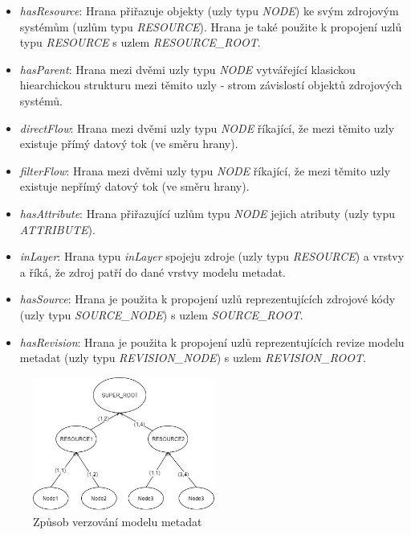  \begin{itemize}
	\item{\textit{hasResource}}: Hrana přiřazuje objekty (uzly typu \textit{NODE}) ke svým zdrojovým systémům (uzlům typu \textit{RESOURCE}). Hrana je také použite k propojení uzlů typu \textit{RESOURCE} s uzlem \textit{RESOURCE\_ROOT}.
	\item{\textit{hasParent}}: Hrana mezi dvěmi uzly typu \textit{NODE} vytvářející klasickou hiearchickou strukturu mezi těmito uzly - strom závislostí objektů zdrojových systémů.
	\item{\textit{directFlow}}: Hrana mezi dvěmi uzly typu \textit{NODE} říkající, že mezi těmito uzly existuje přímý datový tok (ve směru hrany).
	\item{\textit{filterFlow}}: Hrana mezi dvěmi uzly typu \textit{NODE} říkající, že mezi těmito uzly existuje nepřímý datový tok (ve směru hrany).
	\item{\textit{hasAttribute}}: Hrana přiřazující uzlům typu \textit{NODE} jejich atributy (uzly typu \textit{ATTRIBUTE}).
	\item{\textit{inLayer}}: Hrana typu \textit{inLayer} spojeju zdroje (uzly typu \textit{RESOURCE}) a vrstvy a říká, že zdroj patří do dané vrstvy modelu metadat.
	\item{\textit{hasSource}}: Hrana je použita k propojení uzlů reprezentujících zdrojové kódy (uzly typu \textit{SOURCE\_NODE}) s uzlem \textit{SOURCE\_ROOT}.
	\item{\textit{hasRevision}}: Hrana je použita k propojení uzlů reprezentujících revize modelu metadat (uzly typu \textit{REVISION\_NODE}) s uzlem \textit{REVISION\_ROOT}.
\end{itemize}

\begin{figure}
\begin{center}
\includegraphics[width=6cm]{figures/model_revisions}
\caption{Způsob verzování modelu metadat}
\label{fig:ana-model-rev}
\end{center}
\end{figure}

